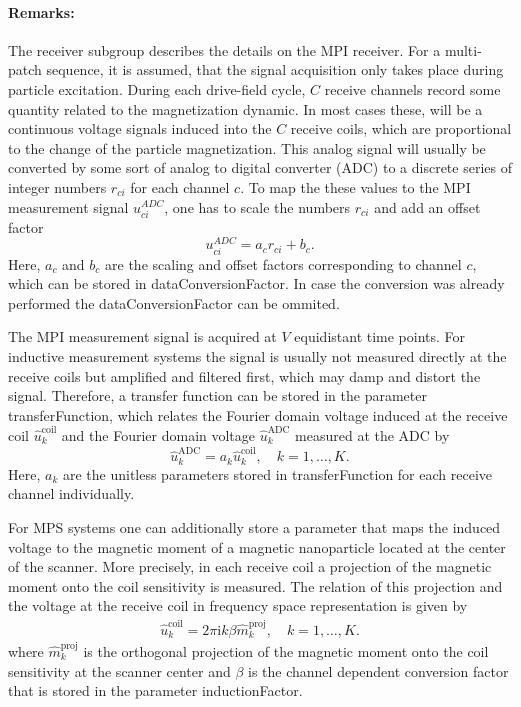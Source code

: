 \documentclass[landscape,a4paper]{article} %
\newcommand{\inlvar}[1]{{\ttfamily#1}}
\begin{document}
\begin{multicols}{2}
	\paragraph{Remarks:} The receiver subgroup describes the details on the MPI receiver. For a multi-patch sequence, it is assumed, that the signal acquisition only takes place during particle excitation. During each drive-field cycle, $C$ receive channels record some quantity related to the magnetization dynamic. In most cases these, will be a continuous voltage signals induced into the $C$ receive coils, which are proportional to the change of the particle magnetization. This analog signal will usually be converted by some sort of analog to digital converter (ADC) to a discrete series of integer numbers $r_{ci}$ for each channel $c$. To map the these values to the MPI measurement signal $u_{ci}^{ADC}$, one has to scale the numbers $r_{ci}$ and add an offset factor
\begin{equation*}
	u_{ci}^{ADC} = a_c r_{ci} +b_c.
\end{equation*}
Here, $a_c$ and $b_c$ are the scaling and offset factors corresponding to channel $c$, which can be stored in \inlvar{dataConversionFactor}. In case the conversion was already performed the \inlvar{dataConversionFactor} can be ommited.

The MPI measurement signal is acquired at $V$ equidistant time points. For inductive measurement systems the signal is usually not measured directly at the receive coils but amplified and filtered first, which may damp and distort the signal. Therefore, a transfer function can be stored in the parameter \inlvar{transferFunction}, which relates the Fourier domain voltage induced at the receive coil $\hat{u}_k^\text{coil}$ and the Fourier domain voltage $\hat{u}_k^\text{ADC}$ measured at the ADC by
\begin{equation*}
\hat{u}_k^\text{ADC} = a_k  \hat{u}_k^\text{coil}, \quad k=1,\dots,K.
\end{equation*}
Here, $a_k$ are the unitless parameters stored in \inlvar{transferFunction} for each receive channel individually. 

For MPS systems one can additionally store a parameter that maps the induced voltage to the magnetic moment of a magnetic nanoparticle located at the center of the scanner. More precisely, in each receive coil a projection of the magnetic moment onto the coil sensitivity is measured. The relation of this projection and the voltage at the receive coil in frequency space representation is given by
\begin{align*}
\hat{u}_k^\text{coil} = 2\pi \textrm{i} k \beta \hat{m}_k^\text{proj} , \quad k=1,\dots,K.
\end{align*}
where  
$\hat m_k^\text{proj}$ is the orthogonal projection of the magnetic moment onto the coil sensitivity at the scanner center
and $\beta$ is the channel dependent conversion factor that is stored in the parameter  \inlvar{inductionFactor}.
\end{multicols}
\end{document}
